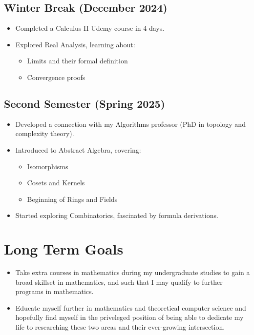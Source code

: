 \documentclass{article}
\begin{document}
\subsection{Winter Break (December 2024)}
\begin{itemize}
    \item Completed a Calculus II Udemy course in 4 days.
    \item Explored Real Analysis, learning about:
    \begin{itemize}
        \item Limits and their formal definition
        \item Convergence proofs
    \end{itemize}
\end{itemize}

\subsection{Second Semester (Spring 2025)}
\begin{itemize}
    \item Developed a connection with my Algorithms professor (PhD in topology and complexity theory).
    \item Introduced to Abstract Algebra, covering:
    \begin{itemize}
        \item Isomorphisms
        \item Cosets and Kernels
        \item Beginning of Rings and Fields
    \end{itemize}
    \item Started exploring Combinatorics, fascinated by formula derivations.
\end{itemize}

\section{Long Term Goals}
\begin{itemize}
  \item Take extra courses in mathematics during my undergraduate studies to gain a broad skillset in mathematics, and such that I may qualify to further programs in mathematics. 
  \item Educate myself further in mathematics and theoretical computer science and hopefully find myself in the priveleged position of being able to dedicate my life to researching these two areas and their ever-growing intersection.
\end{itemize}
\end{document}

